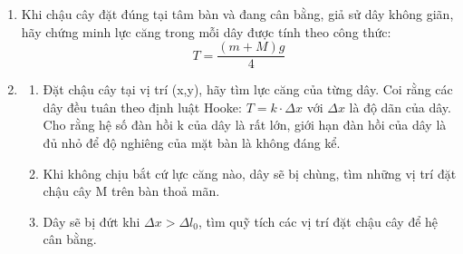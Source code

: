 \begin{enumerate} [label=(\alph*)]
    \item Khi chậu cây đặt đúng tại tâm bàn và đang cân bằng, giả sử dây không giãn, hãy chứng minh lực căng trong mỗi dây được tính theo công thức:
    \begin{equation}
        T = \dfrac{(m+M)g}{4}
    \end{equation}
\item 
\begin{enumerate}[label=(\roman*)]
\item Đặt chậu cây tại vị trí (x,y), hãy tìm lực căng của từng dây. Coi rằng các dây đều
tuân theo định luật Hooke: $T = k \cdot\Delta{x}$ với $\Delta{x}$ là độ dãn của dây. Cho rằng hệ số đàn hồi k của dây là rất lớn, giới hạn đàn hồi của dây là đủ nhỏ để độ nghiêng của mặt bàn là không đáng kể.
\item Khi không chịu bắt cứ lực căng nào, dây sẽ bị chùng, tìm những vị trí  đặt chậu cây M trên bàn thoả mãn.
\item Dây sẽ bị đứt khi $\Delta{x}>\Delta{l_0}$, tìm quỹ tích các vị trí đặt chậu cây để hệ cân bằng.
\end{enumerate}
\end{enumerate}